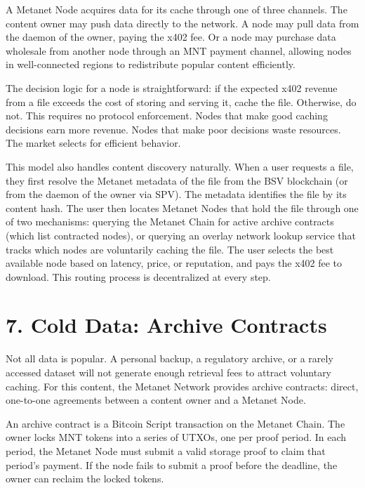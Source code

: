 \documentclass[11pt,a4paper]{article}
\begin{document}
A Metanet Node acquires data for its cache through one of three channels. The content owner may push data directly to the network. A node may pull data from the daemon of the owner, paying the x402 fee. Or a node may purchase data wholesale from another node through an MNT payment channel, allowing nodes in well-connected regions to redistribute popular content efficiently.

The decision logic for a node is straightforward: if the expected x402 revenue from a file exceeds the cost of storing and serving it, cache the file. Otherwise, do not. This requires no protocol enforcement. Nodes that make good caching decisions earn more revenue. Nodes that make poor decisions waste resources. The market selects for efficient behavior.

This model also handles content discovery naturally. When a user requests a file, they first resolve the Metanet metadata of the file from the BSV blockchain (or from the daemon of the owner via SPV). The metadata identifies the file by its content hash. The user then locates Metanet Nodes that hold the file through one of two mechanisms: querying the Metanet Chain for active archive contracts (which list contracted nodes), or querying an overlay network lookup service that tracks which nodes are voluntarily caching the file. The user selects the best available node based on latency, price, or reputation, and pays the x402 fee to download. This routing process is decentralized at every step.

\section{7. Cold Data: Archive Contracts}

Not all data is popular. A personal backup, a regulatory archive, or a rarely accessed dataset will not generate enough retrieval fees to attract voluntary caching. For this content, the Metanet Network provides archive contracts: direct, one-to-one agreements between a content owner and a Metanet Node.

An archive contract is a Bitcoin Script transaction on the Metanet Chain. The owner locks MNT tokens into a series of UTXOs, one per proof period. In each period, the Metanet Node must submit a valid storage proof to claim that period's payment. If the node fails to submit a proof before the deadline, the owner can reclaim the locked tokens.
\end{document}
